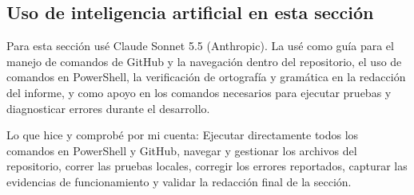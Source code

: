 \subsection{Uso de inteligencia artificial en esta sección}
\label{sec:uso-ia-washington}
Para esta sección usé Claude Sonnet 5.5 (Anthropic). La usé como guía para el manejo de comandos de GitHub y la navegación dentro del repositorio, el uso de comandos en PowerShell, la verificación de ortografía y gramática en la redacción del informe, y como apoyo en los comandos necesarios para ejecutar pruebas y diagnosticar errores durante el desarrollo.

Lo que hice y comprobé por mi cuenta: Ejecutar directamente todos los comandos en PowerShell y GitHub, navegar y gestionar los archivos del repositorio, correr las pruebas locales, corregir los errores reportados, capturar las evidencias de funcionamiento y validar la redacción final de la sección.
